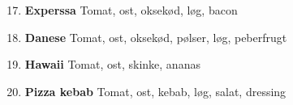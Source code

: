 \documentclass[danish,a4paper]{article}
\begin{document}
\begin{multicols}{2}
\begin{enumerate}[label={\large\textbf{\arabic*}.}]
    \setcounter{enumi}{16}
    \item \textbf{Experssa} Tomat, ost, oksekød, løg, bacon
    \setcounter{enumi}{79}
    \item \textbf{Danese} Tomat, ost, oksekød, pølser, løg, peberfrugt
    \item \textbf{Hawaii} Tomat, ost, skinke, ananas
    \item \textbf{Pizza kebab} Tomat, ost, kebab, løg, salat, dressing
\end{enumerate}

\end{multicols}
\end{document}
